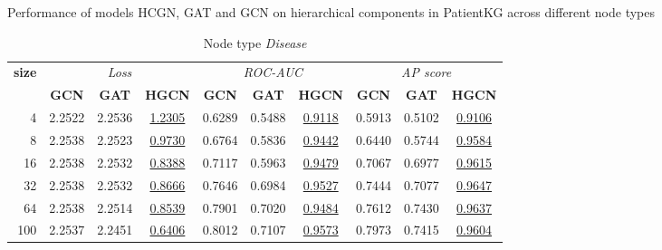 \begin{table} 
    \centering
    \caption{Performance of models HCGN, GAT and GCN on hierarchical components in PatientKG across different node types}
    \label{tab:tabSubclassofPerf}  
    \begin{subtable}[t]{\textwidth}
        \centering
        \begin{tabular}{r|ccc|ccc|ccc}        
            \toprule
            \multirow{2}{*}{\textbf{size}} & \multicolumn{3}{c|}{\textit{Loss}} & \multicolumn{3}{c|}{\textit{ROC-AUC}} & \multicolumn{3}{c}{\textit{AP score}} \\
            & \textbf{GCN} & \textbf{GAT} & \textbf{HGCN} & \textbf{GCN} & \textbf{GAT} & \textbf{HGCN} & \textbf{GCN} & \textbf{GAT} & \textbf{HGCN} \\
            \midrule
                4 & 2.2522 & 2.2536 & \underline{1.2305} & 0.6289 & 0.5488 & \underline{0.9118} & 0.5913 & 0.5102 & \underline{0.9106} \\  
                8 & 2.2538 & 2.2523 & \underline{0.9730} & 0.6764 & 0.5836 & \underline{0.9442} & 0.6440 & 0.5744 & \underline{0.9584} \\
                16 & 2.2538 & 2.2532 & \underline{0.8388} & 0.7117 & 0.5963 & \underline{0.9479} & 0.7067 & 0.6977 & \underline{0.9615} \\
                32 & 2.2538 & 2.2532 & \underline{0.8666} & 0.7646 & 0.6984 & \underline{0.9527} & 0.7444 & 0.7077 & \underline{0.9647} \\
                64 & 2.2538 & 2.2514 & \underline{0.8539} & 0.7901 & 0.7020 & \underline{0.9484} & 0.7612 & 0.7430 & \underline{0.9637} \\
                100 & 2.2537 & 2.2451 & \underline{0.6406} & 0.8012 & 0.7107 & \underline{0.9573} & 0.7973 & 0.7415 & \underline{0.9604} \\
            \bottomrule
        \end{tabular}
        \caption{Node type \textit{Disease}}
    \end{subtable}
    
    \vspace{1em}
    

\end{table}
